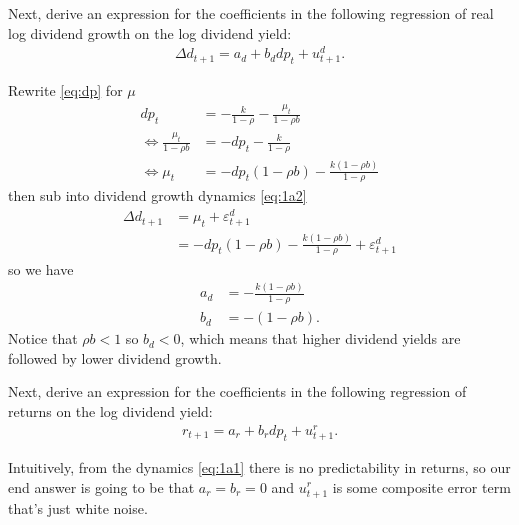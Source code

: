 \begin{answer}[Part d]
Next, derive an expression for the coefficients in the following regression of real log dividend growth on the log dividend yield:
\begin{align}
    \Delta d_{t+1} = a_d + b_d dp_t + u_{t+1}^d. \label{eq:1d}
\end{align}
\end{answer}
Rewrite \eqref{eq:dp} for $\mu$ 
\begin{align}
    dp_t &= -\frac{k}{1-\rho} - \frac{\mu_t}{1-\rho b} \\
    \iff \frac{\mu_t}{1-\rho b} &= -dp_t - \frac{k}{1-\rho} \\
    \iff \mu_t &= -dp_t (1-\rho b) - \frac{k(1-\rho b)}{1-\rho}
\end{align}
then sub into dividend growth dynamics \eqref{eq:1a2}
\begin{align}
    \Delta d_{t+1} &= \mu_t + \varepsilon_{t+1}^d \\
                   &=  -dp_t (1-\rho b) - \frac{k(1-\rho b)}{1-\rho} + \varepsilon_{t+1}^d \label{eq:dnew}
\end{align}
so we have
\begin{align}
    a_d &= -\frac{k(1-\rho b)}{1-\rho} \\
    b_d &= -(1-\rho b).
\end{align}
Notice that $\rho b <1$ so $b_d <0$, which means that higher dividend yields are followed by lower dividend growth.

\begin{answer}[Part e]
Next, derive an expression for the coefficients in the following regression of returns on the log dividend yield:
\begin{align}
    r_{t+1} = a_r + b_r dp_t + u_{t+1}^r.
\end{align}
\end{answer}
Intuitively, from the dynamics \eqref{eq:1a1} there is no predictability in returns, so our end answer is going to be that $a_r=b_r=0$ and $u^r_{t+1}$ is some composite error term that's just white noise. 

